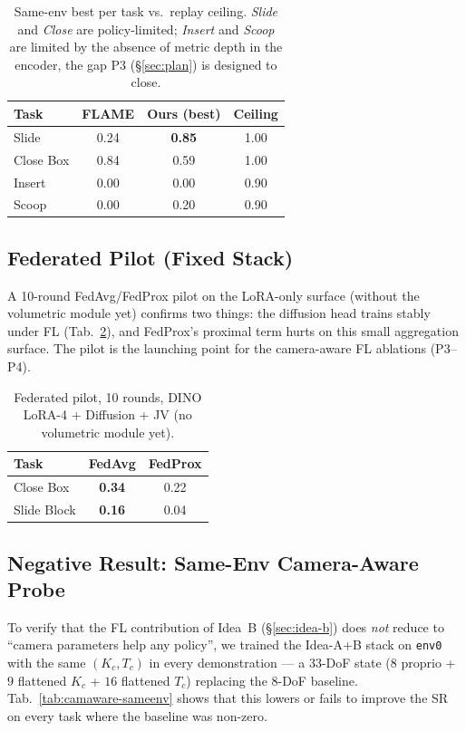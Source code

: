 \documentclass{article}
\begin{document}
\begin{table}[h]
\centering
\small
\caption{Same-env best per task vs.\ replay ceiling. \emph{Slide}
and \emph{Close} are policy-limited; \emph{Insert} and \emph{Scoop}
are limited by the absence of metric depth in the encoder, the gap
P3 (\S\ref{sec:plan}) is designed to close.}
\label{tab:sameenv}
\begin{tabular}{lccc}
\toprule
Task        & FLAME & Ours (best) & Ceiling\\
\midrule
Slide       & 0.24  & \textbf{0.85} & 1.00\\
Close Box   & 0.84  & 0.59          & 1.00\\
Insert      & 0.00  & 0.00          & 0.90\\
Scoop       & 0.00  & 0.20          & 0.90\\
\bottomrule
\end{tabular}
\end{table}

\subsection{Federated Pilot (Fixed Stack)}
\label{sec:fl-pilot}
A 10-round FedAvg/FedProx pilot on the LoRA-only surface
(without the volumetric module yet) confirms two things: the
diffusion head trains stably under FL (Tab.~\ref{tab:fl}), and
FedProx's proximal term hurts on this small aggregation
surface. The pilot is the launching point for the
camera-aware FL ablations (P3--P4).

\begin{table}[h]
\centering
\small
\caption{Federated pilot, 10 rounds, DINO LoRA-4 + Diffusion + JV
(no volumetric module yet).}
\label{tab:fl}
\begin{tabular}{lcc}
\toprule
Task        & FedAvg & FedProx\\
\midrule
Close Box   & \textbf{0.34} & 0.22\\
Slide Block & \textbf{0.16} & 0.04\\
\bottomrule
\end{tabular}
\end{table}

\subsection{Negative Result: Same-Env Camera-Aware Probe}
\label{sec:sameenv-camaware}

To verify that the FL contribution of Idea~B
(\S\ref{sec:idea-b}) does \emph{not} reduce to ``camera
parameters help any policy'', we trained the Idea-A+B stack on
\texttt{env0} with the same $(K_c, T_c)$ in every demonstration ---
a 33-DoF state ($8$ proprio + $9$ flattened $K_c$ + $16$
flattened $T_c$) replacing the 8-DoF baseline. Tab.~\ref{tab:camaware-sameenv}
shows that this lowers or fails to improve the SR on every task
where the baseline was non-zero.
\end{document}
